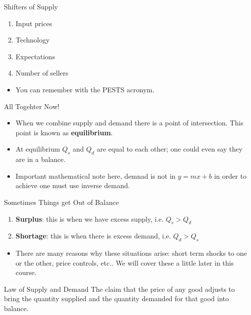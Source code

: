 \documentclass[aspectratio=169]{beamer}
\begin{document}
\begin{frame}{Shifters of Supply}
    \begin{enumerate}
        \item<1-> Input prices
        \item<2-> Technology
        \item<3-> Expectations
        \item<4-> Number of sellers
    \end{enumerate}
    \vspace{5mm}
    \begin{itemize}
        \item<5-> You can remember with the PESTS acronym.
    \end{itemize}
\end{frame}

\begin{frame}{All Togehter Now!}
    \begin{itemize}
        \item When we combine supply and demand there is a point of intersection. This point is known as \textbf{equilibrium}.
        \item At equilibrium $Q_s$ and $Q_d$ are equal to each other; one could even say they are in a balance.
        \item Important mathematical note here, demnad is not in $y = mx + b$ in order to achieve one must use inverse demand.
    \end{itemize}
\end{frame}

\begin{frame}{Sometimes Things get Out of Balance}
    \begin{enumerate}
        \item \textbf{Surplus}: this is when we have excess supply, i.e. $Q_s > Q_d$
        \item \textbf{Shortage}: this is when there is excess demand, i.e. $Q_d > Q_s$
    \end{enumerate}
    \begin{itemize}
    \vspace{5mm}
        \item There are many reasons why these situations arise: short term shocks to one or the other, price controls, etc.. We will cover these a little later in this course.
    \end{itemize}
    \vspace{5mm}
    \begin{block}{Law of Supply and Demand}
    The claim that the price of any good adjusts to bring the quantity supplied and the quantity demanded for that good into balance.
    \end{block}
\end{frame}
\end{document}
